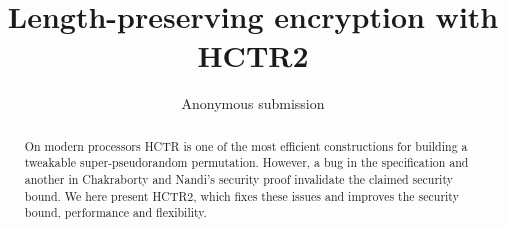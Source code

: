 \documentclass[journal=tosc,submission,floatrow]{iacrtrans}
\author{Anonymous submission}
\title{Length-preserving encryption with HCTR2}
\begin{document}
\maketitle
{}

\begin{abstract}
On modern processors HCTR\cite{hctr} is
one of the most efficient constructions
for building a tweakable super-pseudorandom permutation. However,
a bug in the specification and another in
Chakraborty and Nandi's security proof\cite{hctrquad}
invalidate the claimed security bound. We here present HCTR2,
which fixes these issues and improves the
security bound, performance and flexibility.
\end{abstract}








\printbibliography[heading=bibintoc]
\appendix

%
\end{document}
